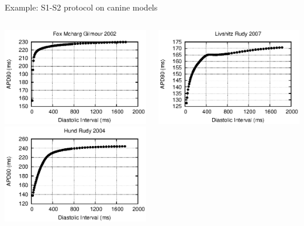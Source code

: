 \documentclass[t,xcolor={usenames,dvipsnames}]{beamer}
\begin{document}
\begin{frame}{Example: S1-S2 protocol on canine models}
\begin{columns}[T]
\begin{column}{.33\linewidth}
\begin{center}
\includegraphics[width=\textwidth]{fox_mcharg_gilmour_2002_s1s2_curve}\\
\vspace{.1cm}
\includegraphics[width=\textwidth]{hund_rudy_2004_s1s2_curve}
\end{center}
\end{column}
\begin{column}{.33\linewidth}
\begin{center}
\includegraphics[width=\textwidth]{livshitz_rudy_2007_s1s2_curve}\\

\end{center}
\end{column}
\end{columns}
\end{frame}
\end{document}
